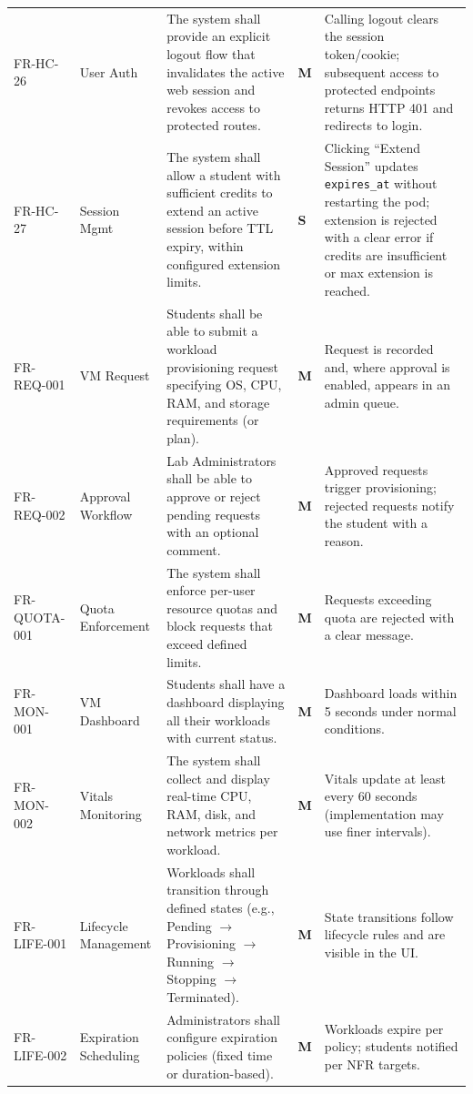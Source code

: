 \documentclass[12pt,a4paper]{article}
\newcommand{\Must}{\textcolor{dangered}{\textbf{M}}}
\newcommand{\Should}{\textcolor{warningyellow}{\textbf{S}}}
\begin{document}
\begin{longtable}{@{}L{2.1cm}L{1.8cm}L{5cm}C{1.4cm}L{5cm}@{}}
    FR-HC-26 & User Auth & The system shall provide an explicit logout flow that invalidates the active web session and revokes access to protected routes. & \Must & Calling logout clears the session token/cookie; subsequent access to protected endpoints returns HTTP 401 and redirects to login. \\
  FR-HC-27 & Session Mgmt & The system shall allow a student with sufficient credits to extend an active session before TTL expiry, within configured extension limits. & \Should & Clicking ``Extend Session'' updates \texttt{expires\_at} without restarting the pod; extension is rejected with a clear error if credits are insufficient or max extension is reached. \\
    FR-REQ-001 & VM Request & Students shall be able to submit a workload provisioning request specifying OS, CPU, RAM, and storage requirements (or plan). & \Must & Request is recorded and, where approval is enabled, appears in an admin queue. \\
  FR-REQ-002 & Approval Workflow & Lab Administrators shall be able to approve or reject pending requests with an optional comment. & \Must & Approved requests trigger provisioning; rejected requests notify the student with a reason. \\
    FR-QUOTA-001 & Quota Enforcement & The system shall enforce per-user resource quotas and block requests that exceed defined limits. & \Must & Requests exceeding quota are rejected with a clear message. \\
  FR-MON-001 & VM Dashboard & Students shall have a dashboard displaying all their workloads with current status. & \Must & Dashboard loads within 5 seconds under normal conditions. \\
    FR-MON-002 & Vitals Monitoring & The system shall collect and display real-time CPU, RAM, disk, and network metrics per workload. & \Must & Vitals update at least every 60 seconds (implementation may use finer intervals). \\
  FR-LIFE-001 & Lifecycle Management & Workloads shall transition through defined states (e.g., Pending $\to$ Provisioning $\to$ Running $\to$ Stopping $\to$ Terminated). & \Must & State transitions follow lifecycle rules and are visible in the UI. \\
    FR-LIFE-002 & Expiration Scheduling & Administrators shall configure expiration policies (fixed time or duration-based). & \Must & Workloads expire per policy; students notified per NFR targets. \\

\end{longtable}
\end{document}
